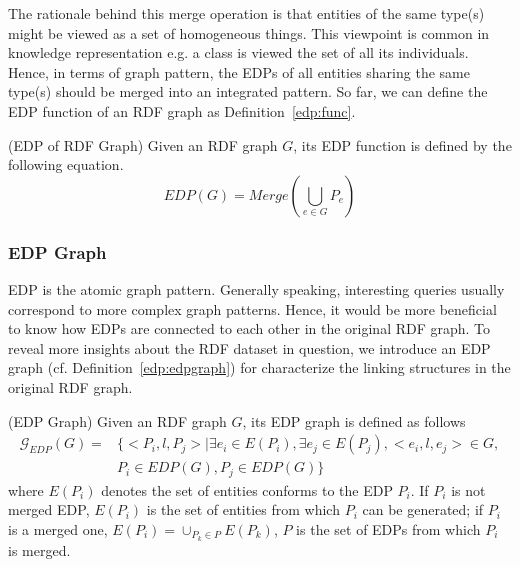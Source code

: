 The rationale behind this merge operation is that entities of the same type(s) might be viewed as a set of homogeneous things. This viewpoint is common in knowledge representation e.g. a class is viewed the set of all its individuals. Hence, in terms of graph pattern, the EDPs of all entities sharing the same type(s) should be merged into an integrated pattern.
So far, we can define the EDP function of an RDF graph as Definition~\ref{edp:func}.

\begin{definition} 
\label{edp:func}
(EDP of RDF Graph) Given an RDF graph $G$, its EDP function is defined by the following equation.
\begin{equation}
EDP(G)=Merge(\bigcup_{e \in G}{P_e})
\end{equation}
\end{definition}

\subsubsection{EDP Graph}
EDP is the atomic graph pattern. Generally speaking, interesting queries usually correspond to more complex graph patterns. Hence, it would be more beneficial to know how EDPs are connected to each other in the original RDF graph. To reveal more insights about the RDF dataset in question, we introduce an EDP graph (cf. Definition~\ref{edp:edpgraph}) for characterize the linking structures in the original RDF graph.

\begin{definition} 
\label{edp:edpgraph} (EDP Graph) Given an RDF graph $G$, its EDP graph is defined as follows
\begin{equation}
\begin{split}
\mathcal{G}_{EDP}(G)= & 
\{<P_i,l,P_j>|\exists e_i \in E(P_i ), \exists e_j \in E(P_j ),<e_i,l,e_j> \in G, \\ 
& P_i \in EDP(G),P_j \in EDP(G) \}
\end{split}
\end{equation}
where $E(P_i)$ denotes the set of entities conforms to the EDP $P_i$. If $P_i$ is not merged EDP, $E(P_i)$ is the set of entities from which $P_i$ can be generated; if $P_i$  is a merged one, $E(P_i )=\cup_{P_k \in P}{E(P_k)}$, $P$ is the set of EDPs from which $P_i$  is merged.
\end{definition}

